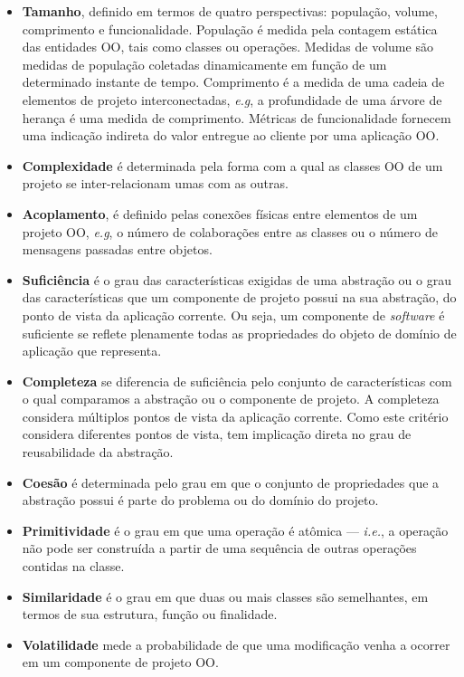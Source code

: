 \begin{itemize}
	\item \textbf{Tamanho}, definido em termos de quatro perspectivas: população, volume, comprimento e funcionalidade. População é medida pela contagem estática das entidades OO, tais como classes ou operações. Medidas de volume são medidas de população coletadas dinamicamente em função de um determinado instante de tempo. Comprimento é a medida de uma cadeia de elementos de projeto interconectadas, \textit{e.g}, a profundidade de uma árvore de herança é uma medida de comprimento. Métricas de funcionalidade fornecem uma indicação indireta do valor entregue ao cliente por uma aplicação OO.
	\item \textbf{Complexidade} é determinada pela forma com a qual as classes OO de um projeto se inter-relacionam umas com as outras.
	\item \textbf{Acoplamento}, é definido pelas conexões físicas entre elementos de um projeto OO, \textit{e.g}, o número de colaborações entre as classes ou o número de mensagens passadas entre objetos.
	\item \textbf{Suficiência} é o grau das características exigidas de uma abstração ou o grau das características que um componente de projeto possui na sua abstração, do ponto de vista da aplicação corrente. Ou seja, um componente de \textit{software} é suficiente se reflete plenamente todas as propriedades do objeto de domínio de aplicação que representa.
	\item \textbf{Completeza} se diferencia de suficiência pelo conjunto de características com o qual comparamos a abstração ou o componente de projeto. A completeza considera múltiplos pontos de vista da aplicação corrente. Como este critério considera diferentes pontos de vista, tem implicação direta no grau de reusabilidade da abstração.
	\item \textbf{Coesão} é determinada pelo grau em que o conjunto de propriedades que a abstração possui é parte do problema ou do domínio do projeto.
	\item \textbf{Primitividade} é o grau em que uma operação é atômica --- \textit{i.e.}, a operação não pode ser construída a partir de uma sequência de outras operações contidas na classe.
	\item \textbf{Similaridade} é o grau em que duas ou mais classes são semelhantes, em termos de sua estrutura, função ou finalidade.
	\item \textbf{Volatilidade} mede a probabilidade de que uma modificação venha a ocorrer em um componente de projeto OO.
\end{itemize}

